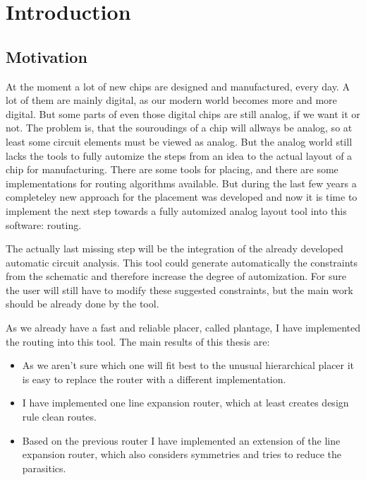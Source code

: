 \chapter{Introduction}

\section{Motivation}
At the moment a lot of new chips are designed and manufactured, every day. A lot of them are mainly digital, as our modern world becomes more and more digital. But some parts of even those digital chips are still analog, if we want it or not. The problem is, that the souroudings of a chip will allways be analog, so at least some circuit elements must be viewed as analog. But the analog world still lacks the tools to fully automize the steps from an idea to the actual layout of a chip for manufacturing. There are some tools for placing, and there are some implementations for routing algorithms available. But during the last few years a completeley new approach for the placement was developed and now it is time to implement the next step towards a fully automized analog layout tool into this software: routing.

The actually last missing step will be the integration of the already developed automatic circuit analysis. This tool could generate automatically the constraints from the schematic and therefore increase the degree of automization. For sure the user will still have to modify these suggested constraints, but the main work should be already done by the tool.

As we already have a fast and reliable placer, called plantage, I have implemented the routing into this tool. The main results of this thesis are:
\begin{itemize}
\item As we aren't sure which one will fit best to the unusual hierarchical placer it is easy to replace the router with a different implementation.
\item I have implemented one line expansion router, which at least creates design rule clean routes.
\item Based on the previous router I have implemented an extension of the line expansion router, which also considers symmetries and tries to reduce the parasitics.
\end{itemize}